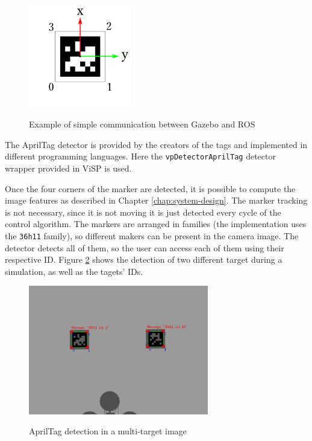 \begin{figure}[!htb]
	\caption{Example of simple communication between Gazebo and ROS}
	\centering
	\includegraphics[width=0.4\textwidth]{content/chapter_05/images/april-frames}
	\label{fig:april-frames}
\end{figure}

The AprilTag detector is provided by the creators of the tags and implemented  in different programming languages. Here the \texttt{vpDetectorAprilTag} detector wrapper provided in ViSP is used. 


Once the four corners of the marker are detected, it is possible to compute the image features as described in Chapter \ref{chap:system-design}. The marker tracking is not necessary, since it is not moving it is just detected every cycle of the control algorithm. The markers are arranged in families (the implementation uses the \texttt{36h11} family), so different makers can be present in the camera image. The detector detects all of them, so the user can access each of them using their respective ID. Figure \ref{fig:apriltag-detection} shows the detection of two different target during a simulation, as well as the tagets' IDs.

\begin{figure}[!htb]
	\caption{AprilTag detection in a multi-target image}
	\centering
	\includegraphics[width=0.7\textwidth]{content/chapter_05/images/april-detection.png}
	\label{fig:apriltag-detection}
\end{figure}


